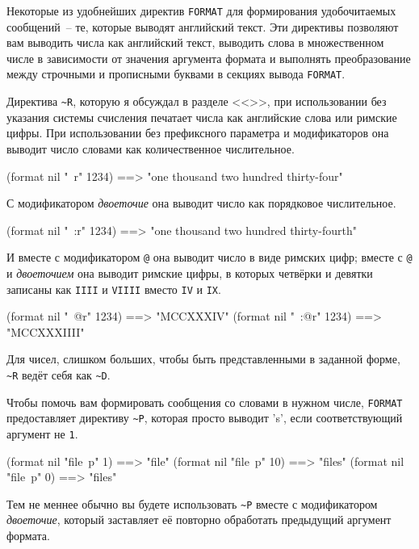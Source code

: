 Некоторые из удобнейших директив \lstinline{FORMAT} для формирования удобочитаемых
сообщений~-- те, которые выводят английский текст. Эти директивы позволяют вам выводить
числа как английский текст, выводить слова в множественном числе в зависимости от значения
аргумента формата и выполнять преобразование между строчными и прописными буквами в
секциях вывода \lstinline{FORMAT}.

Директива \lstinline!~R!, которую я обсуждал в разделе <<>>,
при использовании без указания системы счисления печатает числа как анг\-лийские слова или
римские цифры. При использовании без префиксного параметра и модификаторов она выводит
число словами как количественное числительное.

\begin{myverb}
(format nil "~r" 1234) ==> "one thousand two hundred thirty-four"
\end{myverb}

С модификатором \textit{двоеточие} она выводит число как порядковое числительное.

\begin{myverb}
(format nil "~:r" 1234) ==> "one thousand two hundred thirty-fourth"
\end{myverb}

И вместе с модификатором \lstinline!@! она выводит число в виде римских цифр; вместе с
\lstinline!@! и \textit{двоеточием} она выводит римские цифры, в которых четвёрки и
девятки записаны как \lstinline{IIII} и \lstinline{VIIII} вместо \lstinline{IV} и \lstinline{IX}.

\begin{myverb}
(format nil "~@r" 1234)  ==> "MCCXXXIV"
(format nil "~:@r" 1234) ==> "MCCXXXIIII"
\end{myverb}

Для чисел, слишком больших, чтобы быть представленными в заданной форме, \lstinline!~R!
ведёт себя как \lstinline!~D!.

Чтобы помочь вам формировать сообщения со словами в нужном числе, \lstinline{FORMAT}
предоставляет директиву \lstinline!~P!, которая просто выводит 's', если соответствующий
аргумент не \lstinline{1}.

\begin{myverb}
(format nil "file~p" 1)  ==> "file"
(format nil "file~p" 10) ==> "files"
(format nil "file~p" 0)  ==> "files"
\end{myverb}

Тем не меннее обычно вы будете использовать \lstinline!~P! вместе с модификатором
\textit{двоеточие}, который заставляет её повторно обработать предыдущий аргумент формата.

